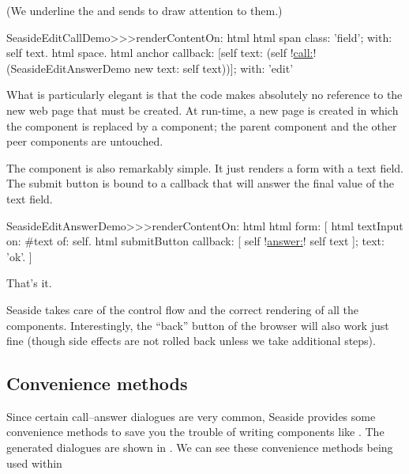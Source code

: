 \documentclass[a4paper,10pt,twoside]{book}
\begin{document}
(We underline the  and  sends to draw attention to them.)

\begin{code}{}
SeasideEditCallDemo>>>renderContentOn: html 
	html span
		class: 'field';
		with: self text.
	html space.
	html anchor
callback: [self text: (self !\underline{call:}! (SeasideEditAnswerDemo new text: self
text))];
		with: 'edit'
\end{code}{}

What is particularly elegant is that the code makes absolutely no reference to the new
web page that must be created.
At run-time, a new page is created in which the  component is
replaced by a  component; the parent component and the other
peer components are untouched.


The  component is also remarkably simple.
It just renders a form with a text field.
The submit button is bound to a callback that will answer the final value of the text
field.

\begin{code}{}
SeasideEditAnswerDemo>>>renderContentOn: html
	html form: [
		html textInput
			on: #text of: self.
		html submitButton
			callback: [ self !\underline{answer:}! self text ];
			text: 'ok'.
		]
\end{code}{}

That's it.

Seaside takes care of the control flow and the correct rendering of all the components.
Interestingly, the ``back'' button of the browser will also work just fine (though side
effects are not rolled back unless we take additional steps).

\subsection{Convenience methods}

Since certain call--answer dialogues are very common, Seaside provides some convenience
methods to save you the trouble of writing components like .
The generated dialogues are shown in .
We can see these convenience methods being used within
\end{document}
